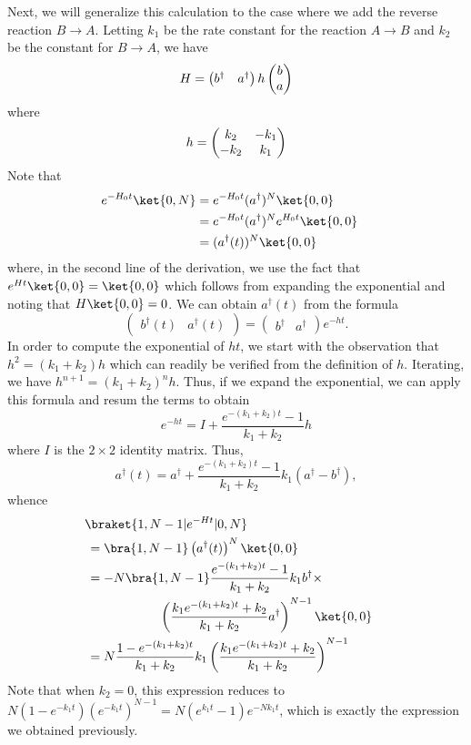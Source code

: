 Next, we will generalize this calculation to the case where we add the reverse reaction $B \to A$.  Letting $k_1$ be the rate constant for the reaction $A \to B$ and $k_2$ be the constant for $B \to A$, we have
\[
 H = \begin{pmatrix} b^\dagger & a^\dagger \end{pmatrix} h \begin{pmatrix} b \cr a \end{pmatrix}
\]
where
\[
 h = \begin{pmatrix} k_2 & -k_1 \cr -k_2 & k_1 \end{pmatrix}
\]
Note that
\begin{align*}
 e^{-H_0 t} \ket{0, N} &=
 e^{-H_0 t} (a^\dagger)^N \ket{0, 0} \cr &=
 e^{-H_0 t} (a^\dagger)^N e^{H_0 t} \ket{0, 0} \cr &=
 (a^\dagger (t))^N \ket{0, 0}
\end{align*}
where, in the second line of the derivation, we use the fact that $e^{Ht} \ket{0, 0} = \ket{0, 0}$ which follows from expanding the exponential and noting that $H \ket{0, 0} = 0$.  We can obtain $a^\dagger (t)$ from the formula
\[
 \begin{pmatrix} b^\dagger(t) & a^\dagger(t) \end{pmatrix} =
 \begin{pmatrix} b^\dagger & a^\dagger \end{pmatrix} e^{-ht} .
\]
In order to compute the exponential of $ht$, we start with the observation that $h^2 = (k_1 + k_2) h$ which can readily be verified from the definition of $h$.  Iterating, we have $h^{n+1} = (k_1 + k_2)^n h$.  Thus, if we expand the exponential, we can apply this formula and resum the terms to obtain
\[
 e^{-ht} = I + \frac{e^{-(k_1 + k_2) t} - 1}{k_1 + k_2} h
\]
where $I$ is the $2 \times 2$ identity matrix.  Thus,
\[
 a^\dagger (t) = a^\dagger +
 \frac{e^{-(k_1 + k_2) t} - 1}{k_1 + k_2} k_1 (a^\dagger - b^\dagger) ,
\]
whence
\begin{align*}
 &\!\braket{1, N-1 | e^{-Ht} | 0, N} \cr &=
 \bra{1, N-1} \left( a^\dagger (t) \right)^N \ket{0, 0} \cr &=
 -N \bra{1, N-1} \frac{e^{-(k_1 + k_2) t} - 1}{k_1 + k_2} k_1 b^\dagger \times \cr
   &\hskip2cm \left( \frac{k_1 e^{-(k_1 + k_2) t} + k_2}{k_1 + k_2} a^\dagger \right)^{N-1} \ket{0, 0} \cr &=
 N \frac{1 - e^{-(k_1 + k_2) t}}{k_1 + k_2} k_1 \left( \frac{k_1 e^{-(k_1 + k_2) t} + k_2}{k_1 + k_2} \right)^{N-1}
\end{align*}
Note that when $k_2 = 0$, this expression reduces to $N(1-e^{-k_1 t})(e^{-k_1 t})^{N-1} =N (e^{k_1 t} - 1) e^{-N k_1 t}$, which is exactly the expression we obtained previously.

